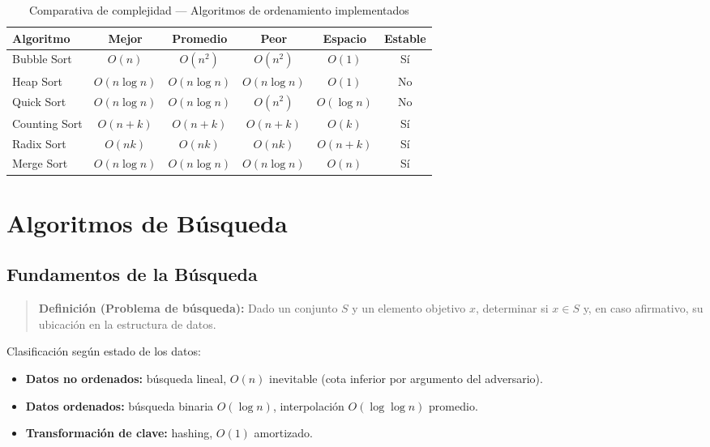 \documentclass[12pt, letterpaper]{article}
\begin{document}
	\begin{table}[h!]
		\centering
		\begin{tabular}{lccccc}
			\toprule
			\textbf{Algoritmo} & \textbf{Mejor} & \textbf{Promedio} & \textbf{Peor} & \textbf{Espacio} & \textbf{Estable} \\
			\midrule
			Bubble Sort   & $O(n)$      & $O(n^2)$     & $O(n^2)$     & $O(1)$    & Sí \\
			Heap Sort     & $O(n\log n)$& $O(n\log n)$ & $O(n\log n)$ & $O(1)$    & No \\
			Quick Sort    & $O(n\log n)$& $O(n\log n)$ & $O(n^2)$     & $O(\log n)$& No \\
			Counting Sort & $O(n+k)$   & $O(n+k)$     & $O(n+k)$     & $O(k)$    & Sí \\
			Radix Sort    & $O(nk)$    & $O(nk)$      & $O(nk)$      & $O(n+k)$  & Sí \\
			Merge Sort    & $O(n\log n)$& $O(n\log n)$ & $O(n\log n)$ & $O(n)$    & Sí \\
			\bottomrule
		\end{tabular}
		\caption{Comparativa de complejidad — Algoritmos de ordenamiento implementados}
	\end{table}
	
	\section{Algoritmos de Búsqueda}
	
	\subsection{Fundamentos de la Búsqueda}
	
	\begin{quote}
		\textbf{Definición (Problema de búsqueda):}
		Dado un conjunto $S$ y un elemento objetivo $x$, determinar si $x \in S$ y, en caso afirmativo, su ubicación en la estructura de datos.
	\end{quote}
	
	Clasificación según estado de los datos:
	\begin{itemize}[noitemsep]
		\item \textbf{Datos no ordenados:} búsqueda lineal, $O(n)$ inevitable (cota inferior por argumento del adversario).
		\item \textbf{Datos ordenados:} búsqueda binaria $O(\log n)$, interpolación $O(\log \log n)$ promedio.
		\item \textbf{Transformación de clave:} hashing, $O(1)$ amortizado.
	\end{itemize}
	
\end{document}
